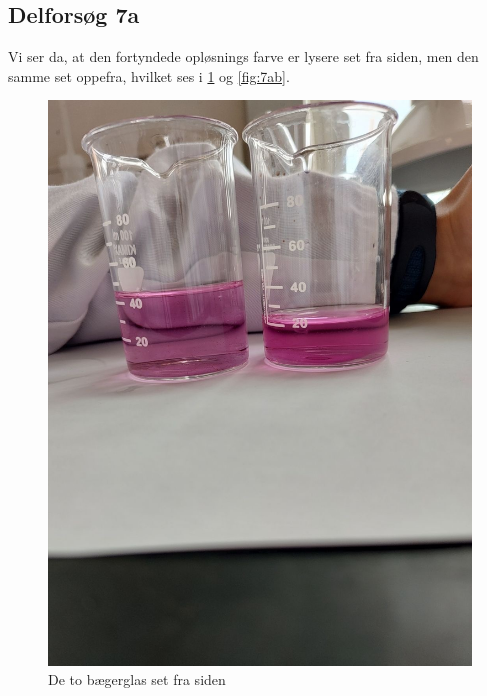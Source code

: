 \documentclass{report}
\begin{document}
\subsection*{Delforsøg 7a}
Vi ser da, at den fortyndede opløsnings farve er lysere set fra siden, men den samme set oppefra, hvilket ses i \cref{fig:7aa} og \cref{fig:7ab}.
\begin{figure}[H]
\begin{center}
  \includegraphics[scale=0.23]{for7aa.jpeg}
\end{center}
\caption{De to bægerglas set fra siden}
\label{fig:7aa}
\end{figure}
\end{document}
